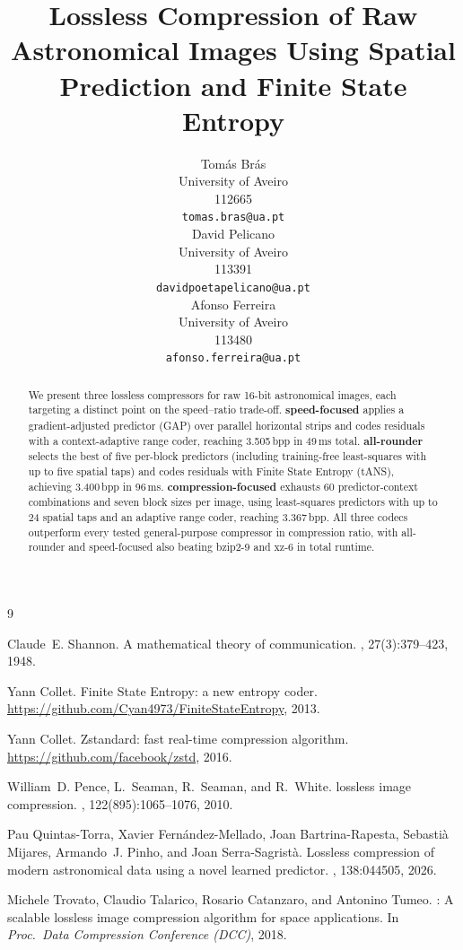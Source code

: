 \documentclass{article}
\title{Lossless Compression of Raw Astronomical Images Using Spatial Prediction and Finite State Entropy}
\author{
  Tom\'as Br\'as \\
  University of Aveiro \\
  112665 \\
  \texttt{tomas.bras@ua.pt} \\
  \And
  David Pelicano \\
  University of Aveiro \\
  113391 \\
  \texttt{davidpoetapelicano@ua.pt} \\
  \And
  Afonso Ferreira \\
  University of Aveiro \\
  113480 \\
  \texttt{afonso.ferreira@ua.pt} \\
}
\date{}
\begin{document}
\maketitle
\begin{abstract}
We present three lossless compressors for raw 16-bit astronomical images,
each targeting a distinct point on the speed--ratio trade-off.
\textbf{speed-focused} applies a gradient-adjusted predictor (GAP) over
parallel horizontal strips and codes residuals with a context-adaptive range
coder, reaching 3.505\,bpp in 49\,ms total.
\textbf{all-rounder} selects the best of five per-block predictors
(including training-free least-squares with up to five spatial taps) and
codes residuals with Finite State Entropy (tANS), achieving 3.400\,bpp in
96\,ms.
\textbf{compression-focused} exhausts 60 predictor-context combinations
and seven block sizes per image, using least-squares predictors with up to
24 spatial taps and an adaptive range coder, reaching 3.367\,bpp.
All three codecs outperform every tested general-purpose compressor in
compression ratio, with all-rounder and speed-focused also beating bzip2-9
and xz-6 in total runtime.
\end{abstract}







\enlargethispage{5\baselineskip}
\begingroup
\footnotesize
\begin{thebibliography}{9}
\setlength{\itemsep}{0pt}
\setlength{\parskip}{0pt}

Claude~E. Shannon.
\newblock A mathematical theory of communication.
, 27(3):379--423, 1948.

Yann Collet.
\newblock Finite State Entropy: a new entropy coder.
\newblock \url{https://github.com/Cyan4973/FiniteStateEntropy}, 2013.

Yann Collet.
\newblock Zstandard: fast real-time compression algorithm.
\newblock \url{https://github.com/facebook/zstd}, 2016.

William~D. Pence, L.~Seaman, R.~Seaman, and R.~White.
 lossless image compression.
,
  122(895):1065--1076, 2010.

Pau Quintas-Torra, Xavier Fern\'{a}ndez-Mellado, Joan Bartrina-Rapesta,
Sebasti\`{a} Mijares, Armando~J. Pinho, and Joan Serra-Sagrist\`{a}.
\newblock Lossless compression of modern astronomical data using a novel
  learned predictor.
,
  138:044505, 2026.

Michele Trovato, Claudio Talarico, Rosario Catanzaro, and Antonino Tumeo.
: A scalable lossless image compression algorithm for
  space applications.
\newblock In {\em Proc.\ Data Compression Conference (DCC)}, 2018.

\end{thebibliography}
\endgroup
\end{document}
